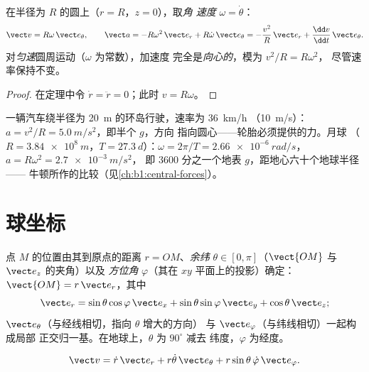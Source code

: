 \begin{corollary}[圆周运动]\label{cor:b1:point-kinematics:circular}
在半径为 $R$ 的圆上（$r = R$，$z = 0$），取\emph{角
速度} $\omega = \dot\theta$：
\[
\vect v = R\omega\,\vect e_\theta, \qquad
\vect a = -R\omega^2\,\vect e_r + R\dot\omega\,\vect e_\theta
= -\frac{v^2}{R}\,\vect e_r + \frac{\dd v}{\dd t}\,\vect e_\theta .
\]
对\emph{匀速}圆周运动（$\omega$ 为常数），加速度
完全是\emph{向心的}，模为 $v^2/R = R\omega^2$，
尽管速率保持不变。
\end{corollary}

\begin{proof}
在定理中令 $\dot r = \ddot r = 0$；此时 $v = R\omega$。
\end{proof}

\begin{example}[两个圆周运动]\label{ex:b1:point-kinematics:circles}
一辆汽车绕半径为 \qty{20}{m} 的环岛行驶，速率为 \qty{36}{km/h}
（\qty{10}{m/s}）：$a = v^2/R = \qty{5.0}{m/s^2}$，即半个 $g$，方向
指向圆心——轮胎必须提供的力。月球
（$R = \qty{3.84e8}{m}$，$T = \qty{27.3}{d}$）：$\omega = 2\pi/T =
\qty{2.66e-6}{rad/s}$，$a = R\omega^2 = \qty{2.7e-3}{m/s^2}$，
即 $3600$ 分之一个地表 $g$，距地心六十个地球半径——
牛顿所作的比较（见\cref{ch:b1:central-forces}）。
\end{example}

\section{球坐标}

\begin{definition}[球坐标]\label{def:b1:point-kinematics:spherical}
点 $M$ 的位置由其到原点的距离 $r = OM$、\emph{余纬}
$\theta \in [0, \pi]$（$\vect{OM}$ 与 $\vect e_z$ 的夹角）以及
\emph{方位角} $\varphi$（其在 $xy$ 平面上的投影）确定：
$\vect{OM} = r\,\vect e_r$，其中
\[
\vect e_r = \sin\theta\cos\varphi\,\vect e_x + \sin\theta\sin\varphi\,\vect e_y + \cos\theta\,\vect e_z ;
\]
$\vect e_\theta$（与经线相切，指向 $\theta$ 增大的方向）
与 $\vect e_\varphi$（与纬线相切）一起构成局部
正交归一基。在地球上，$\theta$ 为 $90^\circ$ 减去
纬度，$\varphi$ 为经度。
\end{definition}

\begin{proposition}[球坐标中的速度]\label{prop:b1:point-kinematics:sphericalv}
\[
\vect v = \dot r\,\vect e_r + r\dot\theta\,\vect e_\theta + r\sin\theta\,\dot\varphi\,\vect e_\varphi .
\]
\end{proposition}

